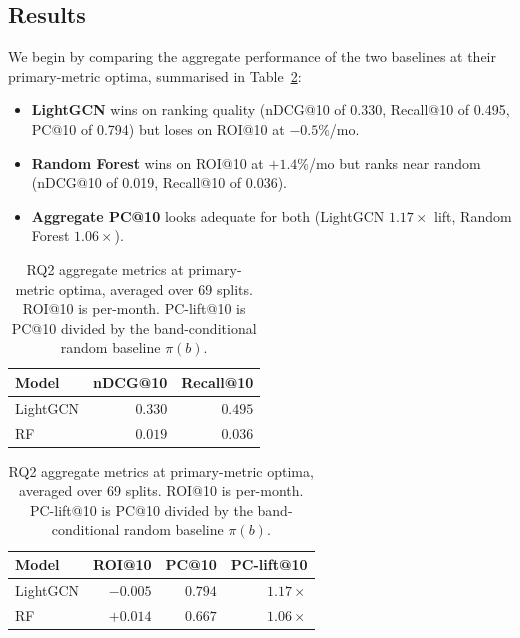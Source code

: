 \subsection{Results}
\label{sec:rq2:results}

We begin by comparing the aggregate performance of the two baselines at their primary-metric optima, summarised in Table~\ref{tab:baseline-aggregate}:
\begin{itemize}
    \item \textbf{LightGCN} wins on ranking quality (nDCG@10 of 0.330, Recall@10 of 0.495, PC@10 of 0.794) but loses on ROI@10 at $-0.5$\%/mo.
    \item \textbf{Random Forest} wins on ROI@10 at $+1.4$\%/mo but ranks near random (nDCG@10 of 0.019, Recall@10 of 0.036).
    \item \textbf{Aggregate PC@10} looks adequate for both (LightGCN $1.17\times$ lift, Random Forest $1.06\times$).
\end{itemize}

\begin{table}[!t]
\centering
\small
\begin{tabular}{lrr}
\toprule
Model & nDCG@10 & Recall@10 \\
\midrule
LightGCN & $0.330$ & $0.495$ \\
RF       & $0.019$ & $0.036$ \\
\bottomrule
\end{tabular}

\vspace{0.6em}

\begin{tabular}{lrrr}
\toprule
Model & ROI@10 & PC@10 & PC-lift@10 \\
\midrule
LightGCN & $-0.005$ & $0.794$ & $1.17\times$ \\
RF       & $+0.014$ & $0.667$ & $1.06\times$ \\
\bottomrule
\end{tabular}
\caption{RQ2 aggregate metrics at primary-metric optima, averaged over 69 splits. ROI@10 is per-month. PC-lift@10 is PC@10 divided by the band-conditional random baseline $\pi(b)$.}
\label{tab:baseline-aggregate}
\end{table}


